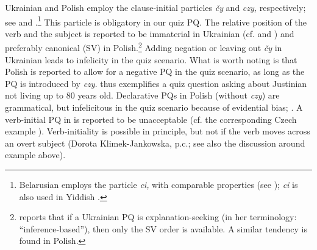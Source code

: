 \documentclass[output=paper,colorlinks,citecolor=brown]{langscibook}
\begin{document}
\ea \label{sim:ex:just-sor}
\z\z

\ea\label{sim:ex:just-slvn}
\z\z

\noindent Ukrainian and Polish employ the clause-initial particles \textit{čy} and \textit{czy,} respectively; see  and .\footnote{Belarusian employs the particle \textit{ci,} with comparable properties (see \citealt{Logvinova2022}); \textit{ci} is also used in Yiddish \citep[181]{Sadock.Zwicky1985}.} This particle is obligatory in our quiz PQ. The relative position of the verb and the subject is reported to be immaterial in Ukrainian (cf.  and ) and preferably canonical (SV) in Polish.\footnote{\citet[26]{Logvinova2022} reports that if a Ukrainian PQ is explanation-seeking (in her terminology: ``inference-based''), then only the SV order is available. A similar tendency is found in Polish.} Adding negation or leaving out \textit{čy} in Ukrainian leads to infelicity in the quiz scenario. What is worth noting is that Polish is reported to allow for a negative PQ in the quiz scenario, as long as the PQ is introduced by \textit{czy}.  thus exemplifies a quiz question asking about Justinian not living up to 80 years old. Declarative PQs in Polish (without \textit{czy}) are grammatical, but infelicitous in the quiz scenario because of evidential bias; . A verb-initial PQ in  is reported to be unacceptable (cf. the corresponding Czech example ). Verb-initiality is possible in principle, but not if the verb moves across an overt subject (Dorota Klimek-Jankowska, p.c.; see also the discussion around example  above).
\end{document}
